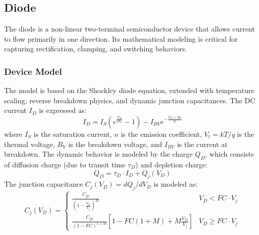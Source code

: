 \subsection{Diode}
The diode is a non-linear two-terminal semiconductor device that allows current to flow primarily in one direction. Its mathematical modeling is critical for capturing rectification, clamping, and switching behaviors.

\subsubsection{Device Model}
The model is based on the Shockley diode equation, extended with temperature scaling, reverse breakdown physics, and dynamic junction capacitances. The DC current $I_D$ is expressed as:
\begin{equation}
    I_D = I_S \left( e^{\frac{V_D}{n V_t}} - 1 \right) - I_{BV} e^{-\frac{V_D + B_V}{V_t}}
\end{equation}
where $I_S$ is the saturation current, $n$ is the emission coefficient, $V_t = k T / q$ is the thermal voltage, $B_V$ is the breakdown voltage, and $I_{BV}$ is the current at breakdown.
The dynamic behavior is modeled by the charge $Q_D$, which consists of diffusion charge (due to transit time $\tau_D$) and depletion charge:
\begin{equation}
    Q_D = \tau_D \cdot I_D + Q_j(V_D)
\end{equation}
The junction capacitance $C_j(V_D) = d Q_j / d V_D$ is modeled as:
\begin{equation}
    C_j(V_D) = \begin{cases}
        \frac{C_{j0}}{\left( 1 - \frac{V_D}{V_j} \right)^M} & V_D < FC \cdot V_j \\
        \frac{C_{j0}}{(1 - FC)^{1+M}} \left[ 1 - FC(1+M) + M \frac{V_D}{V_j} \right] & V_D \ge FC \cdot V_j
    \end{cases}
\end{equation}

